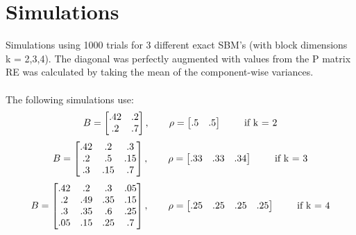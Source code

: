 \documentclass[10pt]{article}
\begin{document}
\section{Simulations} 
Simulations using 1000 trials for 3 different exact SBM's (with block dimensions k = 2,3,4).  The diagonal was perfectly augmented with values from the P matrix\\
RE was calculated by taking the mean of the component-wise variances.\\
\\
The following simulations use:
\begin{equation*}
B = \begin{bmatrix}
.42 & .2 \\
.2 & .7 
\end{bmatrix}
,\qquad \rho = \begin{bmatrix}
.5 & .5
\end{bmatrix} \mbox{ \qquad if k = 2}
\end{equation*}
\begin{equation*}
B = \begin{bmatrix}
.42 & .2 & .3\\
.2 & .5 & .15\\
.3 & .15 & .7
\end{bmatrix}
,\qquad \rho = \begin{bmatrix}
.33 & .33 & .34
\end{bmatrix} \mbox{ \qquad if k = 3}
\end{equation*}
\begin{equation*}
B = \begin{bmatrix}
.42 & .2 & .3 & .05\\
.2 & .49 & .35 & .15\\
.3 & .35 & .6 & .25\\
.05& .15 & .25 & .7
\end{bmatrix}
,\qquad \rho = \begin{bmatrix}
.25 & .25 & .25 &.25
\end{bmatrix} \mbox{ \qquad if k = 4}
\end{equation*}
\newpage
\end{document}
